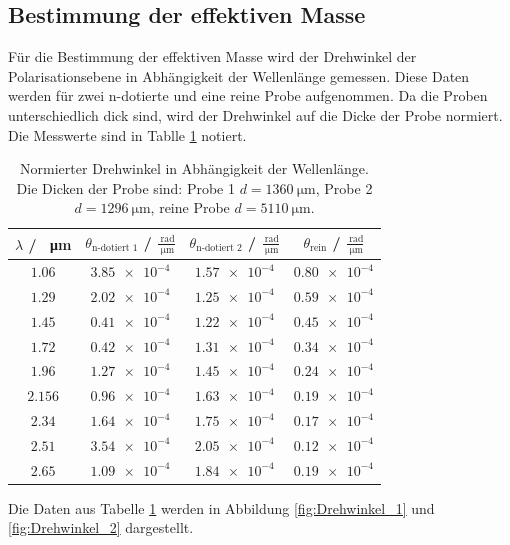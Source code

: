 \subsection{Bestimmung der effektiven Masse}
Für die Bestimmung der effektiven Masse wird der Drehwinkel der Polarisationsebene in Abhängigkeit der Wellenlänge gemessen.
Diese Daten werden für zwei n-dotierte und eine reine Probe aufgenommen. Da die Proben unterschiedlich dick sind, wird 
der Drehwinkel auf die Dicke der Probe normiert.
Die Messwerte sind in Tablle \ref{tab:Drehwinkel} notiert.
\FloatBarrier
\begin{table}
  \centering
  \begin{tabular}{c c c c}
    \toprule
    $\lambda$ / \SI{}{\micro\meter}& $\theta_{\text{n-dotiert 1}}$ / $\frac{\SI{}{\radian}}{\SI{}{\micro\meter}}$& 
    $\theta_{\text{n-dotiert 2}}$ / $\frac{\SI{}{\radian}}{\SI{}{\micro\meter}}$&
    $\theta_{\text{rein}}$ / $\frac{\SI{}{\radian}}{\SI{}{\micro\meter}}$\\
    \midrule
    $\num{1.06} $&$\num{3.85e-4}$&$\num{1.57e-4}$&$\num{0.80e-4}$\\
    $\num{1.29} $&$\num{2.02e-4}$&$\num{1.25e-4}$&$\num{0.59e-4}$\\
    $\num{1.45} $&$\num{0.41e-4}$&$\num{1.22e-4}$&$\num{0.45e-4}$\\
    $\num{1.72} $&$\num{0.42e-4}$&$\num{1.31e-4}$&$\num{0.34e-4}$\\
    $\num{1.96} $&$\num{1.27e-4}$&$\num{1.45e-4}$&$\num{0.24e-4}$\\
    $\num{2.156}$&$\num{0.96e-4}$&$\num{1.63e-4}$&$\num{0.19e-4}$\\
    $\num{2.34} $&$\num{1.64e-4}$&$\num{1.75e-4}$&$\num{0.17e-4}$\\
    $\num{2.51} $&$\num{3.54e-4}$&$\num{2.05e-4}$&$\num{0.12e-4}$\\
    $\num{2.65} $&$\num{1.09e-4}$&$\num{1.84e-4}$&$\num{0.19e-4}$\\
    \bottomrule
  \end{tabular}
  \caption{Normierter Drehwinkel in Abhängigkeit der Wellenlänge. Die Dicken der Probe sind: Probe 1 $d=\SI{1360}{\micro\meter}$,
  Probe 2 $d=\SI{1296}{\micro\meter}$, reine Probe $d=\SI{5110}{\micro\meter}$.}
  \label{tab:Drehwinkel}
\end{table}
\FloatBarrier
Die Daten aus Tabelle \ref{tab:Drehwinkel} werden in Abbildung \ref{fig:Drehwinkel_1} und \ref{fig:Drehwinkel_2} 
dargestellt.
\FloatBarrier
